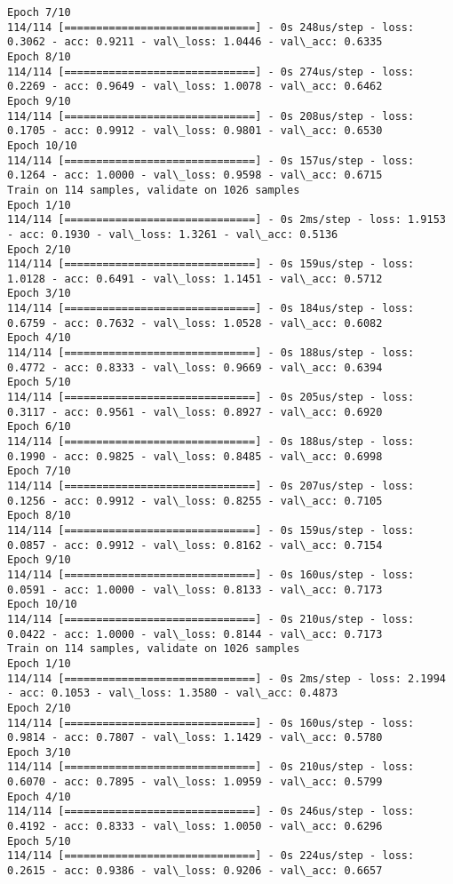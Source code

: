 \documentclass[11pt]{article}
\begin{document}
\begin{Verbatim}[commandchars=\\\{\}]
Epoch 7/10
114/114 [==============================] - 0s 248us/step - loss: 0.3062 - acc: 0.9211 - val\_loss: 1.0446 - val\_acc: 0.6335
Epoch 8/10
114/114 [==============================] - 0s 274us/step - loss: 0.2269 - acc: 0.9649 - val\_loss: 1.0078 - val\_acc: 0.6462
Epoch 9/10
114/114 [==============================] - 0s 208us/step - loss: 0.1705 - acc: 0.9912 - val\_loss: 0.9801 - val\_acc: 0.6530
Epoch 10/10
114/114 [==============================] - 0s 157us/step - loss: 0.1264 - acc: 1.0000 - val\_loss: 0.9598 - val\_acc: 0.6715
Train on 114 samples, validate on 1026 samples
Epoch 1/10
114/114 [==============================] - 0s 2ms/step - loss: 1.9153 - acc: 0.1930 - val\_loss: 1.3261 - val\_acc: 0.5136
Epoch 2/10
114/114 [==============================] - 0s 159us/step - loss: 1.0128 - acc: 0.6491 - val\_loss: 1.1451 - val\_acc: 0.5712
Epoch 3/10
114/114 [==============================] - 0s 184us/step - loss: 0.6759 - acc: 0.7632 - val\_loss: 1.0528 - val\_acc: 0.6082
Epoch 4/10
114/114 [==============================] - 0s 188us/step - loss: 0.4772 - acc: 0.8333 - val\_loss: 0.9669 - val\_acc: 0.6394
Epoch 5/10
114/114 [==============================] - 0s 205us/step - loss: 0.3117 - acc: 0.9561 - val\_loss: 0.8927 - val\_acc: 0.6920
Epoch 6/10
114/114 [==============================] - 0s 188us/step - loss: 0.1990 - acc: 0.9825 - val\_loss: 0.8485 - val\_acc: 0.6998
Epoch 7/10
114/114 [==============================] - 0s 207us/step - loss: 0.1256 - acc: 0.9912 - val\_loss: 0.8255 - val\_acc: 0.7105
Epoch 8/10
114/114 [==============================] - 0s 159us/step - loss: 0.0857 - acc: 0.9912 - val\_loss: 0.8162 - val\_acc: 0.7154
Epoch 9/10
114/114 [==============================] - 0s 160us/step - loss: 0.0591 - acc: 1.0000 - val\_loss: 0.8133 - val\_acc: 0.7173
Epoch 10/10
114/114 [==============================] - 0s 210us/step - loss: 0.0422 - acc: 1.0000 - val\_loss: 0.8144 - val\_acc: 0.7173
Train on 114 samples, validate on 1026 samples
Epoch 1/10
114/114 [==============================] - 0s 2ms/step - loss: 2.1994 - acc: 0.1053 - val\_loss: 1.3580 - val\_acc: 0.4873
Epoch 2/10
114/114 [==============================] - 0s 160us/step - loss: 0.9814 - acc: 0.7807 - val\_loss: 1.1429 - val\_acc: 0.5780
Epoch 3/10
114/114 [==============================] - 0s 210us/step - loss: 0.6070 - acc: 0.7895 - val\_loss: 1.0959 - val\_acc: 0.5799
Epoch 4/10
114/114 [==============================] - 0s 246us/step - loss: 0.4192 - acc: 0.8333 - val\_loss: 1.0050 - val\_acc: 0.6296
Epoch 5/10
114/114 [==============================] - 0s 224us/step - loss: 0.2615 - acc: 0.9386 - val\_loss: 0.9206 - val\_acc: 0.6657

\end{Verbatim}
\end{document}
